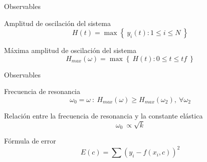 \begin{frame}{Observables}
    \begin{block}{Amplitud de oscilación del sistema}
        \begin{equation*}
            H(t) = \max \left\{\ y_i(t) : 1 \leq i \leq N\ \right\}
        \end{equation*}
    \end{block}

    \begin{block}{Máxima amplitud de oscilación del sistema}
        \begin{equation*}
            H_{max}(\omega) = \max \left\{\ H(t) : 0 \leq t \leq tf\ \right\}
        \end{equation*}
    \end{block}
\end{frame}

\begin{frame}{Observables}
    \small{
    \begin{block}{Frecuencia de resonancia}
        \begin{equation*}
            \omega_{0} = \omega\ :\ H_{max}(\omega) \geq H_{max}(\omega_2),\ \forall\omega_2
        \end{equation*}
    \end{block}

    \begin{block}{Relación entre la frecuencia de resonancia y la constante elástica}
        \begin{equation*}
            \omega_{0}\ \propto \sqrt{k}
        \end{equation*}
    \end{block}

    \begin{block}{Fórmula de error}
        \begin{equation*}
            E(c) = \sum (y_i - f(x_i, c))^2
        \end{equation*}
    \end{block}
    }
\end{frame}

